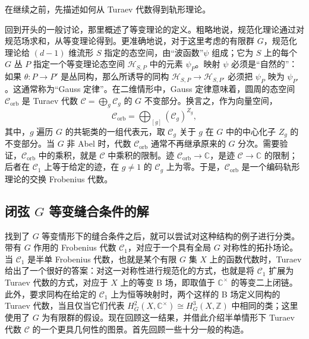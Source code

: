 在继续之前，先描述如何从 Turaev 代数得到轨形理论。

回到开头的一般讨论，那里概述了等变理论的定义。粗略地说，规范化理论通过对规范场求和，从等变理论得到。更准确地说，对于这里考虑的有限群 $G$，规范化理论给 $(d-1)$ 维流形 $S$ 指定的态空间，由“波函数”$\psi$ 组成；它为 $S$ 上的每个 $G$ 丛 $P$ 指定一个等变理论态空间 $\mathcal{H}_{S,P}$ 中的元素 $\psi_P$。映射 $\psi$ 必须是“自然的”：如果 $\theta\colon P\to P'$ 是丛同构，那么所诱导的同构 $\mathcal{H}_{S,P}\to\mathcal{H}_{S,P'}$ 必须把 $\psi_P$ 映为 $\psi_{P'}$。这通常称为“Gauss 定律”。在二维情形中，Gauss 定律意味着，圆周的态空间 $\mathcal{C}_{\mathrm{orb}}$ 是 Turaev 代数 $\mathcal{C}=\bigoplus_g\mathcal{C}_g$ 的 $G$ 不变部分。换言之，作为向量空间，
\begin{equation}\label{eq:2.86}
\mathcal{C}_{\mathrm{orb}}=\bigoplus_{[g]}(\mathcal{C}_g)^{Z_g},
\end{equation}
其中，$g$ 遍历 $G$ 的共轭类的一组代表元，取 $\mathcal{C}_g$ 关于 $g$ 在 $G$ 中的中心化子 $Z_g$ 的不变部分。当 $G$ 非 Abel 时，代数 $\mathcal{C}_{\mathrm{orb}}$ 通常不再继承原来的 $G$ 分次。需要验证，$\mathcal{C}_{\mathrm{orb}}$ 中的乘积，就是 $\mathcal{C}$ 中乘积的限制。迹 $\mathcal{C}_{\mathrm{orb}}\to\mathbb{C}$，是迹 $\mathcal{C}\to\mathbb{C}$ 的限制；后者在 $\mathcal{C}_1$ 上等于给定的迹，在 $g\ne1$ 的 $\mathcal{C}_g$ 上为零。于是，$\mathcal{C}_{\mathrm{orb}}$ 是一个编码轨形理论的交换 Frobenius 代数。

\subsection{闭弦 \texorpdfstring{$G$}{G} 等变缝合条件的解}\label{sec:2.6.3}

找到了 $G$ 等变情形下的缝合条件之后，就可以尝试对这种结构的例子进行分类。带有 $G$ 作用的 Frobenius 代数 $\mathcal{C}_1$，对应于一个具有全局 $G$ 对称性的拓扑场论。当 $\mathcal{C}_1$ 是半单 Frobenius 代数，也就是某个有限 $G$ 集 $X$ 上的函数代数时，Turaev 给出了一个很好的答案：对这一对称性进行规范化的方式，也就是将 $\mathcal{C}_1$ 扩展为 Turaev 代数的方式，对应于 $X$ 上的等变 B 场，即取值于 $\mathbb{C}^{\times}$ 的等变二上闭链。此外，要求同构在给定的 $\mathcal{C}_1$ 上为恒等映射时，两个这样的 B 场定义同构的 Turaev 代数，当且仅当它们代表 $H_G^2(X,\mathbb{C}^{\times})\cong H_G^3(X,\mathbb{Z})$ 中相同的类；这里使用了 $G$ 为有限群的假设。现在回顾这一结果，并借此介绍半单情形下 Turaev 代数 $\mathcal{C}$ 的一个更具几何性的图景。首先回顾一些十分一般的构造。

